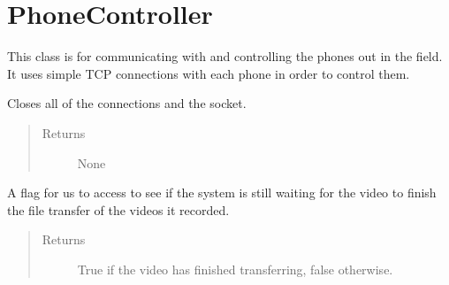 \documentclass[letterpaper,10pt,english]{sphinxmanual}
\begin{document}
\chapter{PhoneController}
\label{\detokenize{index:module-src.Controllers.PhoneController}}\label{\detokenize{index:phonecontroller}}

\begin{fulllineitems}
\label{\detokenize{index:src.Controllers.PhoneController.PhoneControl}}
This class is for communicating with and controlling the phones out in the field. It uses simple
TCP connections with each phone in order to control them.

\begin{fulllineitems}
\label{\detokenize{index:src.Controllers.PhoneController.PhoneControl.closeConn}}
Closes all of the connections and the socket.
\begin{quote}\begin{description}
\item[{Returns}] \leavevmode
None

\end{description}\end{quote}

\end{fulllineitems}


\begin{fulllineitems}
\label{\detokenize{index:src.Controllers.PhoneController.PhoneControl.isTransferring}}
A flag for us to access to see if the system is still waiting for the video to finish the file
transfer of the videos it recorded.
\begin{quote}\begin{description}
\item[{Returns}] \leavevmode
True if the video has finished transferring, false otherwise.


\end{description}
\end{quote}
\end{fulllineitems}
\end{fulllineitems}
\end{document}
